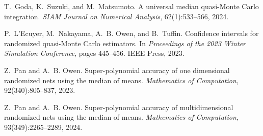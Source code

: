 \documentclass[12pt,lettersize,oneside]{book} %
\begin{document}
\begin{talk}
{\item
T.~Goda, K.~Suzuki, and M.~Matsumoto.
A universal median quasi-{Monte Carlo} integration.
{\em {SIAM} Journal on Numerical Analysis}, 62(1):533--566, 2024.

\item
P.~L'Ecuyer, M.~Nakayama, A.~B. Owen, and B.~Tuffin.
Confidence intervals for randomized quasi-{Monte Carlo} estimators.
In {\em Proceedings of the 2023 Winter Simulation Conference}, pages
  445--456. IEEE Press, 2023.

\item
Z.~Pan and A.~B. Owen.
Super-polynomial accuracy of one dimensional randomized nets using
  the median of means.
{\em Mathematics of Computation}, 92(340):805--837, 2023.

\item
Z.~Pan and A.~B. Owen.
Super-polynomial accuracy of multidimensional randomized nets using
  the median of means.
{\em Mathematics of Computation}, 93(349):2265--2289, 2024.

}
\end{talk}
\end{document}
